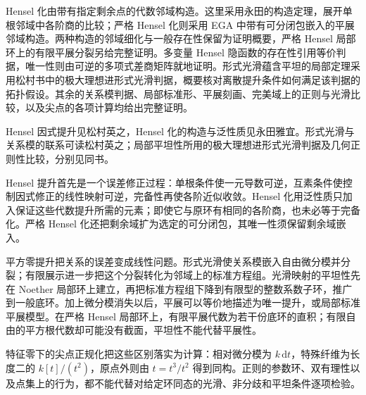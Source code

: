 \ProseParagraphBreak
Hensel 化由带有指定剩余点的代数邻域构造。这里采用永田的构造定理，展开单根邻域中各阶商的比较；严格 Hensel 化则采用 EGA 中带有可分闭包嵌入的平展邻域构造。两种构造的邻域细化与一般存在性保留为证明概要，严格 Hensel 局部环上的有限平展分裂另给完整证明。多变量 Hensel 隐函数的存在性引用等价判据，唯一性则由可逆的多项式差商矩阵就地证明。形式光滑蕴含平坦的局部定理采用松村书中的极大理想进形式光滑判据，概要核对离散提升条件如何满足该判据的拓扑假设。其余的关系模判据、局部标准形、平展刻画、完美域上的正则与光滑比较，以及尖点的各项计算均给出完整证明。

\ProseParagraphBreak
Hensel 因式提升见松村英之\cite[Theorem 8.3, p. 58]{Matsumura1989CommutativeRingTheory}，Hensel 化的构造与泛性质见永田雅宜\cite[\S43, (43.3), (43.5), (43.8)--(43.10), pp. 180--183]{Nagata1975LocalRings}。形式光滑与关系模的联系可读松村英之\cite[Theorem 25.2, pp. 194--195]{Matsumura1989CommutativeRingTheory}；局部平坦性所用的极大理想进形式光滑判据及几何正则性比较，分别见同书\cite[Theorem 28.9, p. 222; Theorem 30.3 and Remark 2, pp. 233--235]{Matsumura1989CommutativeRingTheory}。






\begin{chaptersummary}
	Hensel 提升首先是一个误差修正过程：单根条件使一元导数可逆，互素条件使控制因式修正的线性映射可逆，完备性再使各阶近似收敛。Hensel 化用泛性质只加入保证这些代数提升所需的元素；即使它与原环有相同的各阶商，也未必等于完备化。严格 Hensel 化还把剩余域扩为选定的可分闭包，其唯一性须保留剩余域嵌入。

	\ProseParagraphBreak
	平方零提升把关系的误差变成线性问题。形式光滑使关系模嵌入自由微分模并分裂；有限展示进一步把这个分裂转化为邻域上的标准方程组。光滑映射的平坦性先在 Noether 局部环上建立，再把标准方程组下降到有限型的整数系数子环，推广到一般底环。加上微分模消失以后，平展可以等价地描述为唯一提升，或局部标准平展模型。在严格 Hensel 局部环上，有限平展代数为若干份底环的直积；有限自由的平方根代数却可能没有截面，平坦性不能代替平展性。

	\ProseParagraphBreak
	特征零下的尖点正规化把这些区别落实为计算：相对微分模为 \(k\,\mathrm{d}t\)，特殊纤维为长度二的 \(k[t]/(t^2)\)，原点外则由 \(t=t^3/t^2\) 得到同构。正则的参数环、双有理性以及点集上的行为，都不能代替对给定环同态的光滑、非分歧和平坦条件逐项检验。
\end{chaptersummary}

\BookExercises

